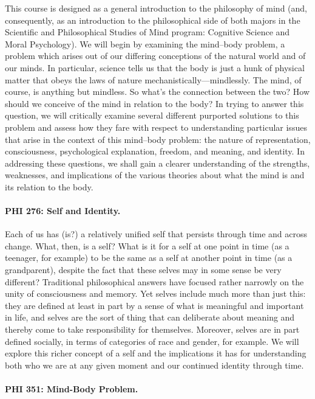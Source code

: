 \documentclass[11pt]{article}
\begin{document}
This course is designed as a general introduction to the philosophy of mind (and, consequently, as an introduction to the philosophical side of both majors in the Scientific and Philosophical Studies of Mind program: Cognitive Science and Moral Psychology). We will begin by examining the mind--body problem, a problem which arises out of our differing conceptions of the natural world and of our minds. In particular, science tells us that the body is just a hunk of physical matter that obeys the laws of nature mechanistically---mindlessly. The mind, of course, is anything but mindless. So what's the connection between the two? How should we conceive of the mind in relation to the body? In trying to answer this question, we will critically examine several different purported solutions to this problem and assess how they fare with respect to understanding particular issues that arise in the context of this mind--body problem: the nature of representation, consciousness, psychological explanation, freedom, and meaning, and identity. In addressing these questions, we shall gain a clearer understanding of the strengths, weaknesses, and implications of the various theories about what the mind is and its relation to the body.

\paragraph{PHI 276: Self and Identity.}

Each of us has (is?) a relatively unified self that persists through time and across change. What, then, is a self? What is it for a self at one point in time (as a teenager, for example) to be the same as a self at another point in time (as a grandparent), despite the fact that these selves may in some sense be very different? Traditional philosophical answers have focused rather narrowly on the unity of consciousness and memory. Yet selves include much more than just this: they are defined at least in part by a sense of what is meaningful and important in life, and selves are the sort of thing that can deliberate about meaning and thereby come to take responsibility for themselves. Moreover, selves are in part defined socially, in terms of categories of race and gender, for example. We will explore this richer concept of a self and the implications it has for understanding both who we are at any given moment and our continued identity through time.

\paragraph{PHI 351: Mind-Body Problem.}
\end{document}
